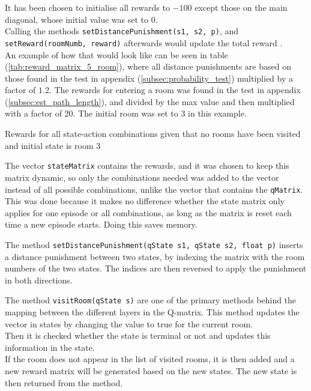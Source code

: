 \documentclass[../Head/Main.tex]{subfiles}
\begin{document}
\clearpage
It has been chosen to initialise all rewards to $-100$ except those on the main diagonal, whose initial value was set to $0$.\\
Calling the methods \texttt{setDistancePunishment(s1, s2, p)}, and \texttt{setReward(roomNumb, reward)} afterwards would update the total reward .\\
An example of how that would look like can be seen in table (\ref{tab:reward_matrix_5_room}), where all distance punishments are based on those found in the test in appendix (\ref{subsec:probability_test}) multiplied by a factor of $1.2$. The rewards for entering a room was found in the test in appendix (\ref{subsec:est_path_length}), and divided by the max value and then multiplied with a factor of 20. The initial room was set to 3 in this example.
\begin{table}[H]
	\centering
	
	\caption{Rewards for all state-action combinations given that no rooms have been visited and initial state is room 3}
	\vspace{-20pt}
	\label{tab:reward_matrix_5_room}
\end{table}
The vector \texttt{stateMatrix} contains the rewards, and it was chosen to keep this matrix dynamic, so only the combinations needed was added to the vector instead of all possible combinations, unlike the vector that contains the \texttt{qMatrix}. This was done because it makes no difference whether the state matrix only applies for one episode or all combinations, as long as the matrix is reset each time a new episode starts. Doing this saves memory.\par  
The method \texttt{setDistancePunishment(qState s1, qState s2, float p)} inserts a distance punishment between two states, by indexing the matrix with the room numbers of the two states. The indices are then reversed to apply the punishment in both directions.\par  

The method \texttt{visitRoom(qState s)} are one of the primary methods behind the mapping between the different layers in the Q-matrix. This method updates the vector in states by changing the value to true for the current room.\\
Then it is checked whether the state is terminal or not and updates this information in the state.\\
If the room does not appear in the list of visited rooms, it is then added and a new reward matrix will be generated based on the new states. The new state is then returned from the method.\par 
\end{document}
